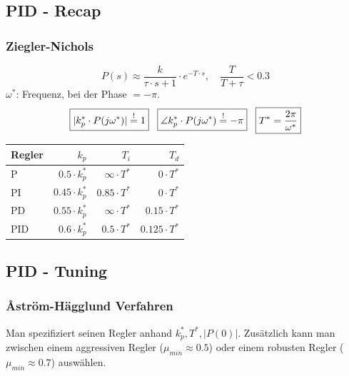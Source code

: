 \subsection{PID - Recap}
    \subsubsection{Ziegler-Nichols}
    \begin{equation*}
        P(s) \approx \frac{k}{\tau\cdot s + 1}\cdot e^{-T\cdot s}, \quad \frac{T}{T+\tau} < 0.3
    \end{equation*}
      $\omega^*$: Frequenz, bei der Phase $= -\pi$.
        \begin{equation*}
            \boxed{|k_p^* \cdot P(j\omega^*)| \overset{!}{=} 1} \hspace{3mm}
            \boxed{\angle k_p^* \cdot P(j\omega^*)\overset{!}{=}-\pi} \hspace{3mm}
            \boxed{T^* =\frac{2\pi}{\omega^*}}
        \end{equation*}
        \begin{center}
        {\renewcommand{\arraystretch}{1.5}
            \begin{tabular}{l r r r}
            Regler & $k_p$ & $T_i$ & $T_d$ \\
                 \hline
                P & $0.5\cdot k_p^*$ & $\infty \cdot T^*$ & $0 \cdot T^*$ \\
                PI & $0.45\cdot k_p^*$ & $0.85\cdot T^*$ & $0 \cdot T^*$\\
                PD & $0.55 \cdot k_p^* $& $\infty \cdot T^*$ &  $0.15\cdot T^*$\\
                PID & $0.6\cdot k_p^*$ & $0.5 \cdot T^*$ & $0.125 \cdot T^*$\\
            \end{tabular}}
        \end{center}

\subsection{PID - Tuning}
    \subsubsection{\r{A}ström-Hägglund Verfahren}
        Man spezifiziert seinen Regler anhand $k_p^*, T^*, |P(0)|$. Zusätzlich kann man zwischen einem aggressiven Regler ($\mu_{min} \approx 0.5$) oder einem robusten Regler ($\mu_{min} \approx 0.7$) auswählen.
        
